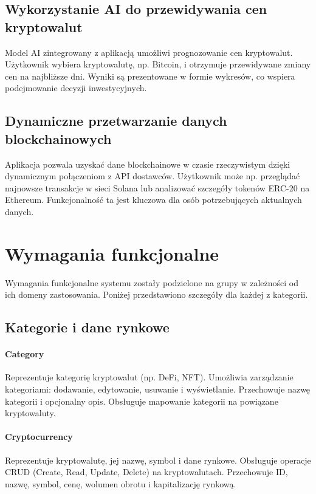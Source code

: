 \subsection{Wykorzystanie AI do przewidywania cen kryptowalut}
Model AI zintegrowany z aplikacją umożliwi prognozowanie cen kryptowalut. Użytkownik wybiera kryptowalutę, np. Bitcoin, i otrzymuje przewidywane zmiany cen na najbliższe dni. Wyniki są prezentowane w formie wykresów, co wspiera podejmowanie decyzji inwestycyjnych.

\subsection{Dynamiczne przetwarzanie danych blockchainowych}
Aplikacja pozwala uzyskać dane blockchainowe w czasie rzeczywistym dzięki dynamicznym połączeniom z API dostawców. Użytkownik może np. przeglądać najnowsze transakcje w sieci Solana lub analizować szczegóły tokenów ERC-20 na Ethereum. Funkcjonalność ta jest kluczowa dla osób potrzebujących aktualnych danych.

\section{Wymagania funkcjonalne}

Wymagania funkcjonalne systemu zostały podzielone na grupy w zależności od ich domeny zastosowania. Poniżej przedstawiono szczegóły dla każdej z kategorii.

\subsection{Kategorie i dane rynkowe}

\paragraph{Category} Reprezentuje kategorię kryptowalut (np. DeFi, NFT). Umożliwia zarządzanie kategoriami: dodawanie, edytowanie, usuwanie i wyświetlanie. Przechowuje nazwę kategorii i opcjonalny opis. Obsługuje mapowanie kategorii na powiązane kryptowaluty.

\paragraph{Cryptocurrency} Reprezentuje kryptowalutę, jej nazwę, symbol i dane rynkowe. Obsługuje operacje CRUD (Create, Read, Update, Delete) na kryptowalutach. Przechowuje ID, nazwę, symbol, cenę, wolumen obrotu i kapitalizację rynkową.


